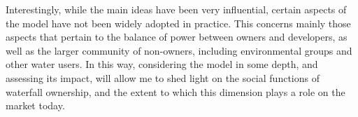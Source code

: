 Interestingly, while the main ideas have been very influential, certain aspects of the model have not been widely adopted in practice. This concerns mainly those aspects that pertain to the balance of power between owners and developers, as well as the larger community of non-owners, including environmental groups and other water users. In this way, considering the model in some depth, and assessing its impact, will allow me to shed light on the social functions of waterfall ownership, and the extent to which this dimension plays a role on the market today.



